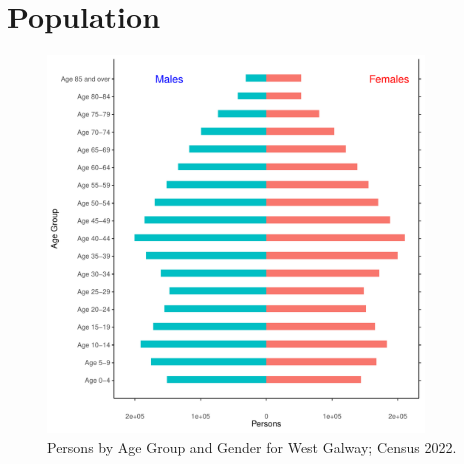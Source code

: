 \documentclass{article}
\begin{document}
\pagebreak

\section{Population} 
\label{sect:Pop}

\begin{figure}[h]
	\centering
	\includegraphics[width = 100mm]{../figures/PyramidPlot.pdf}
	\caption{Persons by Age Group and Gender for West Galway; Census 2022.}
	\label{fig:2ae19629-1a6a-13a3-e055-000000000001}
	\end{figure}
\end{document}
